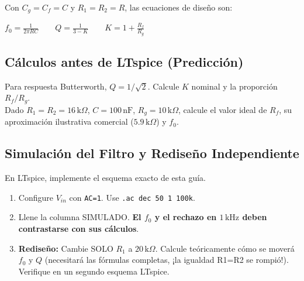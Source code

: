\documentclass[11pt, a4paper]{article}
\begin{document}
Con $C_g = C_f = C$ y $R_1 = R_2 = R$, las ecuaciones de diseño son:
{\centering $\displaystyle f_0 = \frac{1}{2\pi RC} \qquad Q = \frac{1}{3-K} \qquad K = 1 + \frac{R_f}{R_g}$ \par}

\subsection{Cálculos antes de LTspice (Predicción)}
Para respuesta Butterworth, $Q = 1/\sqrt{2}$. Calcule $K$ nominal y la proporción $R_f / R_g$. \\
Dado $R_1=R_2=16\,\text{k}\Omega$, $C=100\,\text{nF}$, $R_g=10\,\text{k}\Omega$, calcule el valor ideal de $R_f$, su aproximación ilustrativa comercial ($5.9\,\text{k}\Omega$) y $f_0$.

\vspace{3cm}

\subsection{Simulación del Filtro y Rediseño Independiente}
En LTspice, implemente el esquema exacto de esta guía.
\begin{enumerate}
    \item Configure $V_{in}$ con \texttt{AC=1}. Use \texttt{.ac dec 50 1 100k}.
    \item Llene la columna SIMULADO. \textbf{El $f_0$ y el rechazo en $1\,\text{kHz}$ deben contrastarse con sus cálculos}.
    \item \textbf{Rediseño:} Cambie SOLO $R_1$ a $20\,\text{k}\Omega$. Calcule teóricamente cómo se moverá $f_0$ y $Q$ (necesitará las fórmulas completas, ¡la igualdad R1=R2 se rompió!). Verifique en un segundo esquema LTspice.
\end{enumerate}
\end{document}
